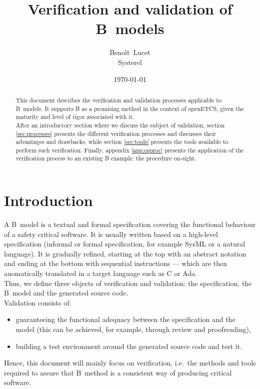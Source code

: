\documentclass{article}
\title{Verification and validation of B~models}
\author{Benoît~Lucet\\Systerel}
\date{\today}
\begin{document}
\maketitle

\begin{abstract}
This document describes the verification and validation processes applicable to B~models. It supports B as a promising method in the context of openETCS, given the maturity and level of rigor associated with it.\\
After an introductory section where we discuss the subject of validation, section \ref{sec:processes} presents the different verification processes and discusses their advantages and drawbacks, while section \ref{sec:tools} presents the tools available to perform such verification. Finally, appendix \ref{app:osproc} presents the application of the verification process to an existing B example: the procedure on-sight.
\end{abstract}

\newpage

\tableofcontents

\newpage

\section{Introduction}
\label{sec:intro}
A B~model is a textual and formal specification covering the functional behaviour of a safety critical software. It is usually written based on a high-level specification (informal or formal specification, for example SysML or a natural language). It is gradually refined, starting at the top with an abstract notation and ending at the bottom with sequential instructions --- which are then auomatically translated in a target language such as C or Ada.\\
Thus, we define three objects of verification and validation: the specification, the B~model and the generated source code.\\

Validation consists of:
\begin{itemize}
\item guaranteeing the functional adequacy between the specification and the model (this can be achieved, for example, through review and proofreading),
\item building a test environment around the generated source code and test it.
\end{itemize}
Hence, this document will mainly focus on verification, i.e.\ the methods and tools required to assure that B~method is a consistent way of producing critical software.
\end{document}

